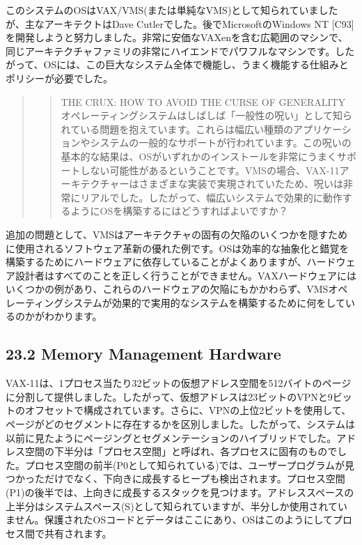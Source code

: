このシステムのOSはVAX/VMS(または単純なVMS)として知られていましたが、主なアーキテクトはDave
Cutlerでした。後でMicrosoftのWindows NT
{[}C93{]}を開発しようと努力しました。非常に安価なVAXenを含む広範囲のマシンで、同じアーキテクチャファミリの非常にハイエンドでパワフルなマシンです。したがって、OSには、この巨大なシステム全体で機能し、うまく機能する仕組みとポリシーが必要でした。

\begin{quote}
\begin{quote}
THE CRUX: HOW TO AVOID THE CURSE OF GENERALITY
オペレーティングシステムはしばしば「一般性の呪い」として知られている問題を抱えています。これらは幅広い種類のアプリケーションやシステムの一般的なサポートが行われています。この呪いの基本的な結果は、OSがいずれかのインストールを非常にうまくサポートしない可能性があるということです。VMSの場合、VAX-11アーキテクチャーはさまざまな実装で実現されていたため、呪いは非常にリアルでした。したがって、幅広いシステムで効果的に動作するようにOSを構築するにはどうすればよいですか？
\end{quote}
\end{quote}

追加の問題として、VMSはアーキテクチャの固有の欠陥のいくつかを隠すために使用されるソフトウェア革新の優れた例です。OSは効率的な抽象化と錯覚を構築するためにハードウェアに依存していることがよくありますが、ハードウェア設計者はすべてのことを正しく行うことができません。VAXハードウェアにはいくつかの例があり、これらのハードウェアの欠陥にもかかわらず、VMSオペレーティングシステムが効果的で実用的なシステムを構築するために何をしているのかがわかります。

\hypertarget{memory-management-hardware}{%
\subsection*{23.2 Memory Management
Hardware}\label{memory-management-hardware}}

VAX-11は、1プロセス当たり32ビットの仮想アドレス空間を512バイトのページに分割して提供しました。したがって、仮想アドレスは23ビットのVPNと9ビットのオフセットで構成されています。さらに、VPNの上位2ビットを使用して、ページがどのセグメントに存在するかを区別しました。したがって、システムは以前に見たようにページングとセグメンテーションのハイブリッドでした。アドレス空間の下半分は「プロセス空間」と呼ばれ、各プロセスに固有のものでした。プロセス空間の前半(P0として知られている)では、ユーザープログラムが見つかっただけでなく、下向きに成長するヒープも検出されます。プロセス空間(P1)の後半では、上向きに成長するスタックを見つけます。アドレススペースの上半分はシステムスペース(S)として知られていますが、半分しか使用されていません。保護されたOSコードとデータはここにあり、OSはこのようにしてプロセス間で共有されます。

